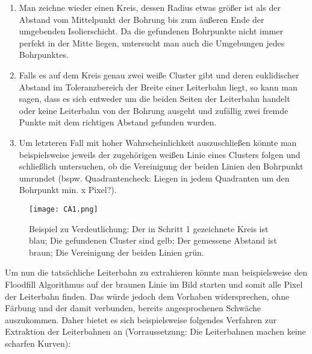 \begin{enumerate}
\item Man zeichne wieder einen Kreis, dessen Radius etwas größer ist als der Abstand vom Mittelpunkt der Bohrung bis zum äußeren Ende der umgebenden Isolierschicht. \newline
Da die gefundenen Bohrpunkte nicht immer perfekt in der Mitte liegen, untersucht man auch die Umgebungen jedes Bohrpunktes.
\item Falls es auf dem Kreis genau zwei weiße Cluster gibt und deren euklidischer Abstand im Toleranzbereich der Breite einer Leiterbahn liegt, so kann man sagen, dass es sich entweder um die beiden Seiten der Leiterbahn handelt oder keine Leiterbahn von der Bohrung ausgeht und zufällig zwei fremde Punkte mit dem richtigen Abstand gefunden wurden.
\item Um letzteren Fall mit hoher Wahrscheinlichkeit auszuschließen könnte man beispielsweise jeweils der zugehörigen weißen Linie eines Clusters folgen und schließlich untersuchen, ob die Vereinigung der beiden Linien den Bohrpunkt umrundet (bspw. Quadrantencheck: Liegen in jedem Quadranten um den Bohrpunkt min. x Pixel?).
\end{enumerate}

\begin{figure}[H]
  \begin{center}
    \texttt{[image: CA1.png]}
    \caption{Beispiel zu Verdeutlichung: Der in Schritt 1 gezeichnete Kreis ist blau; Die gefundenen Cluster sind gelb; Der gemessene Abstand ist braun; Die Vereinigung der beiden Linien grün.}
    \label{fig:l_alg_1}
  \end{center}
\end{figure}

Um nun die tatsächliche Leiterbahn zu extrahieren könnte man beispielsweise den Floodfill Algorithmus auf der braunen Linie im Bild starten und somit alle Pixel der Leiterbahn finden. Das würde jedoch dem Vorhaben widersprechen, ohne Färbung und der damit verbunden, bereits angesprochenen Schwäche auszukommen. \newline
Daher bietet es sich beispielsweise folgendes Verfahren zur Extraktion der Leiterbahnen an (Vorraussetzung: Die Leiterbahnen machen keine scharfen Kurven): \newline

